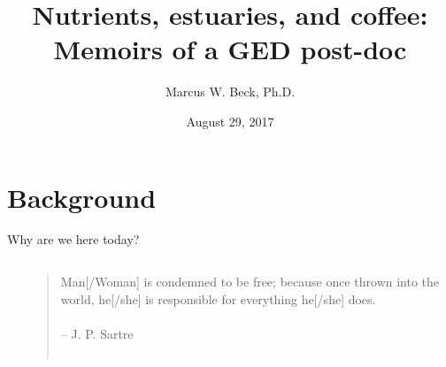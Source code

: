 \documentclass[serif]{beamer}\usepackage[]{graphicx}\usepackage[]{color}
\begin{document}
\title[Memoirs of a GED post-doc]{\textbf{Nutrients, estuaries, and coffee: Memoirs of a GED post-doc}}
\author[M. Beck]{Marcus W. Beck, Ph.D.}


\date{August 29, 2017}


\begin{frame}[shrink]
\titlepage
\end{frame}

\section{Background}

\begin{frame}{Why are we here today?}{}
\begin{columns}
\begin{column}{0.5\textwidth}
\begin{center}
\centerline{}
\end{center}
\end{column}
\begin{column}{0.5\textwidth}
\begin{quote}
\normalsize
Man[/Woman] is condemned to be free; because once thrown into the world, he[/she] is responsible for everything he[/she] does.\\~\\
\vspace{0.05in}
\hfill -- J. P. Sartre\\~\\
\end{quote}
\end{column}
\end{columns}
\end{frame}
\end{document}
